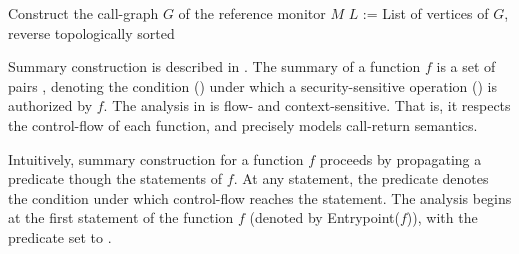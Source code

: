 \linesnumbered
\begin{algorithm}[ht!]
\SetVline
{}

\dontprintsemicolon

Construct the call-graph $G$ of the reference monitor $M$\;
$L$ := List of vertices of $G$, reverse topologically sorted\;
{\label{algorithm:analyzemodule}}
\end{algorithm}

Summary construction is described in .  The
summary of a function $f$ is a set of pairs , denoting the
condition () under which a security-sensitive operation () is
authorized by $f$. The analysis in  is flow-
and context-sensitive.  That is, it respects the control-flow of each function,
and precisely models call-return semantics.

Intuitively, summary construction for a function $f$ proceeds by propagating a
predicate  though the statements of $f$. At any statement, the
predicate denotes the condition under which control-flow reaches the statement.
The analysis begins at the first statement of the function $f$ (denoted by
\textsf{Entrypoint}{($f$)}), with the predicate set to .

